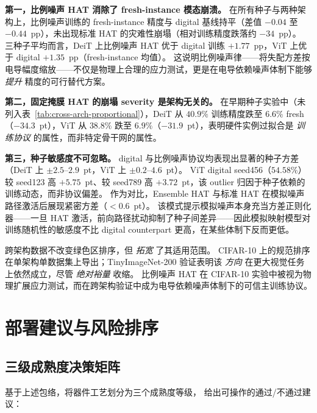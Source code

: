 \textbf{第一，比例噪声 HAT 消除了 fresh-instance 模态崩溃。}
在所有种子与两种架构上，比例噪声训练的 fresh-instance 精度与 digital 基线持平（差值 $-0.04$ 至 $-0.44$~pp），未出现标准 HAT 的灾难性崩塌（相对训练精度跌落约 $-34$~pp）。
三种子平均而言，DeiT 上比例噪声 HAT 优于 digital 训练 $+1.77$~pp，ViT 上优于 digital $+1.35$~pp（fresh-instance 均值）。
这说明比例噪声律——将失配方差按电导幅度缩放——不仅是物理上合理的应力测试，更是在电导依赖噪声体制下能够 \emph{提升} 精度的可行替代方案。

\textbf{第二，固定掩膜 HAT 的崩塌 severity 是架构无关的。}
在早期种子实验中（未列入表~\ref{tab:cross-arch-proportional}），DeiT 从 $40.9\%$ 训练精度跌至 $6.6\%$ fresh（$-34.3$~pt），ViT 从 $38.8\%$ 跌至 $6.9\%$（$-31.9$~pt），表明硬件实例过拟合是 \emph{训练协议} 的属性，而非特定骨干网的属性。

\textbf{第三，种子敏感度不可忽略。}
digital 与比例噪声协议均表现出显著的种子方差（DeiT 上 $\pm 2.5$--$2.9$~pt，ViT 上 $\pm 0.2$--$4.6$~pt）。
ViT digital seed456（$54.58\%$）较 seed123 高 $+5.75$~pt、较 seed789 高 $+3.72$~pt，该 outlier 归因于种子依赖的训练动态，而非协议偏差。
作为对比，Ensemble HAT 与标准 HAT 在模拟噪声路径激活后展现紧密方差（$<0.6$~pt）。
该模式提示模拟噪声本身充当方差正则化器——一旦 HAT 激活，前向路径扰动抑制了种子间差异——因此模拟映射模型对训练随机性的敏感度不比 digital  counterpart 更高，在某些体制下反而更低。

跨架构数据不改变绿色区排序，但 \emph{拓宽} 了其适用范围。
CIFAR-10 上的规范排序在单架构单数据集上导出；TinyImageNet-200 验证表明该 \emph{方向} 在更大视觉任务上依然成立，尽管 \emph{绝对裕量} 收缩。
比例噪声 HAT 在 CIFAR-10 实验中被视为物理扩展应力测试，而在跨架构验证中成为电导依赖噪声体制下的可信主训练协议。


\section{部署建议与风险排序}
\label{sec:deployment-recommendations}

\subsection{三级成熟度决策矩阵}

基于上述包络，将器件工艺划分为三个成熟度等级，
给出可操作的通过/不通过建议：

